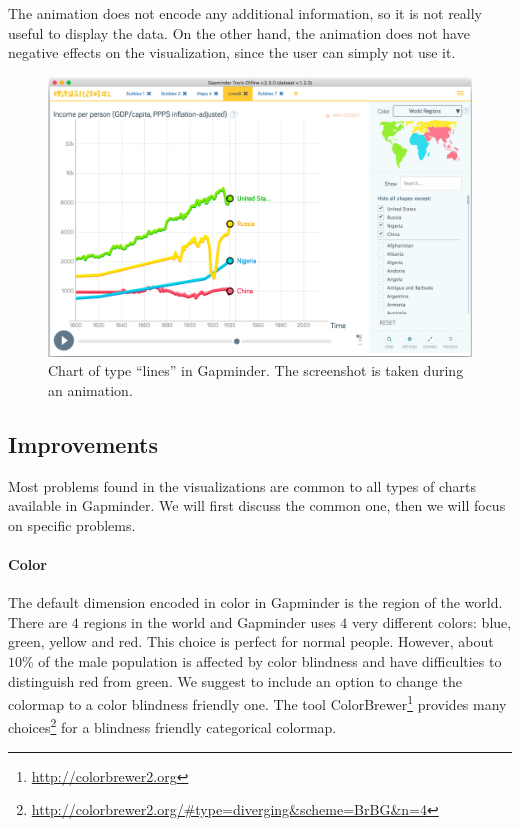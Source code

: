 The animation does not encode any additional information, so it is not really useful to display the data.
On the other hand, the animation does not have negative effects on the visualization, since the user can simply not use it.

\begin{figure}[h]
	\centering
	\includegraphics[width=0.95\columnwidth]{figures/lines-animation}
	\caption{Chart of type ``lines'' in Gapminder. The screenshot is taken during an animation.}
	\label{fig:lines-animation}
\end{figure}


\subsection{Improvements}
Most problems found in the visualizations are common to all types of charts available in Gapminder.
We will first discuss the common one, then we will focus on specific problems.

\paragraph{Color}
The default dimension encoded in color in Gapminder is the region of the world.
There are $4$ regions in the world and Gapminder uses $4$ very different colors: blue, green, yellow and red.
This choice is perfect for normal people.
However, about $10\%$ of the male population is affected by color blindness \cite{color-maps} and have difficulties to distinguish red from green.
We suggest to include an option to change the colormap to a color blindness friendly one.
The tool ColorBrewer\footnote{\url{http://colorbrewer2.org}} provides many choices\footnote{\url{http://colorbrewer2.org/#type=diverging&scheme=BrBG&n=4}} for a blindness friendly categorical colormap.

